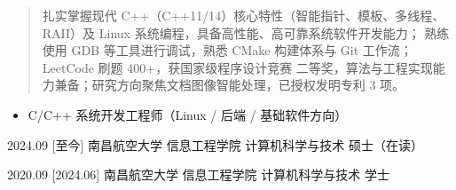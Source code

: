 \documentclass[zh]{resume}
\begin{document}
\makeheader

\begin{abstract}
扎实掌握现代 C++（C++11/14）核心特性（智能指针、模板、多线程、RAII）及 Linux 系统编程，具备高性能、高可靠系统软件开发能力；
熟练使用 GDB 等工具进行调试，熟悉 CMake 构建体系与 Git 工作流；
LeetCode 刷题 400+，获国家级程序设计竞赛 二等奖，算法与工程实现能力兼备；研究方向聚焦文档图像智能处理，已授权发明专利 3 项。
\end{abstract}

\begin{itemize}
  \item C/C++ 系统开发工程师（Linux / 后端 / 基础软件方向）
\end{itemize}

\begin{competences}
\end{competences}

\begin{educations}
  \education%
    {2024.09}%
    [至今]%
    {南昌航空大学}%
    {信息工程学院}%
    {计算机科学与技术}%
    {硕士（在读）}

  \separator{0.5ex}
  \education%
    {2020.09}%
    [2024.06]%
    {南昌航空大学}%
    {信息工程学院}%
    {计算机科学与技术}%
    {学士}
\end{educations}
\end{document}
